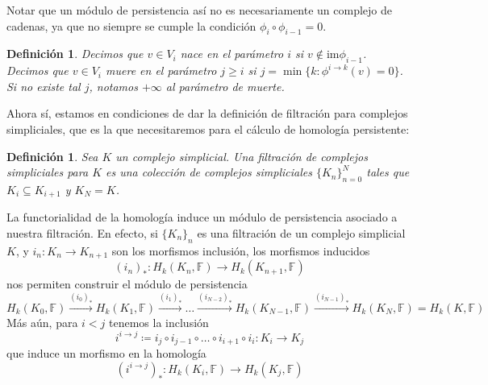 \documentclass[12pt,a4paper]{article}
\newtheorem{definition}[theorem]{Definición}
\begin{document}
Notar que un módulo de persistencia así no es necesariamente un complejo de cadenas, ya que no siempre se cumple la condición $\phi_i \circ \phi_{i-1} = 0$.
\begin{definition}
    Decimos que $v \in V_i$ \textit{nace} en el parámetro $i$ si $v \notin \text{im}\phi_{i-1}$.
    \\
    Decimos que $v \in V_i$ \textit{muere} en el parámetro $j \geq i$ si $j = \min \{k : \phi^{i \rightarrow k}(v) = 0\}$. Si no existe tal $j$, notamos $+\infty$ al parámetro de muerte.
\end{definition}
Ahora sí, estamos en condiciones de dar la definición de filtración para complejos simpliciales, que es la que necesitaremos para el cálculo de homología persistente:
\begin{definition}
    Sea $K$ un complejo simplicial. Una filtración de complejos simpliciales para $K$ es una colección de complejos simpliciales $\{K_n\}_{n=0}^N$ tales que $K_i \subseteq K_{i+1}$ y $K_N = K$.
\end{definition}
La functorialidad de la homología induce un módulo de persistencia asociado a nuestra filtración. En efecto, si $\{K_n\}_n$ es una filtración de un complejo simplicial $K$, y $i_n: K_n \rightarrow K_{n+1}$ son los morfismos inclusión, los morfismos inducidos
\[
(i_n)_* : H_k(K_n, \mathbb{F}) \rightarrow H_k(K_{n+1}, \mathbb{F})
\]
nos permiten construir el módulo de persistencia
\[
H_k(K_0, \mathbb{F}) \xrightarrow{(i_0)_*} H_k(K_1, \mathbb{F}) \xrightarrow{(i_1)_*} \ldots \xrightarrow{(i_{N-2})_*} H_k(K_{N-1}, \mathbb{F}) \xrightarrow{(i_{N-1})_*} H_k(K_N, \mathbb{F}) = H_k(K, \mathbb{F})
\]
Más aún, para $i < j$ tenemos la inclusión
\[
i^{i\rightarrow j} \coloneqq i_j \circ i_{j-1} \circ \ldots \circ i_{i+1} \circ i_i : K_i \rightarrow K_j
\]
que induce un morfismo en la homología
\[
(i^{i \rightarrow j})_* : H_k(K_i, \mathbb{F}) \rightarrow H_k(K_j, \mathbb{F})
\]
\end{document}
